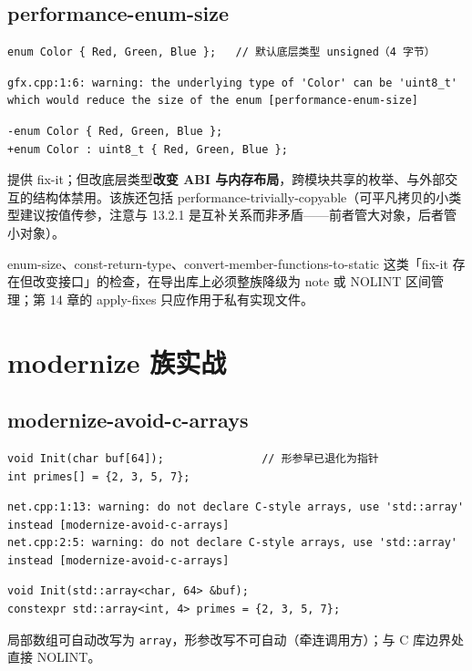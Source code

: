 \documentclass[12pt,a4paper,fontset=fandol]{ctexbook}
\newcommand{\Tp}[1]{\texttt{#1}}
\begin{document}
\subsection{performance-enum-size}\label{sec:ch13-s2d}
\begin{lstlisting}[style=cppstyle]
enum Color { Red, Green, Blue };   // 默认底层类型 unsigned（4 字节）
\end{lstlisting}
\begin{lstlisting}[style=shellstyle]
gfx.cpp:1:6: warning: the underlying type of 'Color' can be 'uint8_t'
which would reduce the size of the enum [performance-enum-size]
\end{lstlisting}
\begin{lstlisting}[style=diffstyle]
-enum Color { Red, Green, Blue };
+enum Color : uint8_t { Red, Green, Blue };
\end{lstlisting}
提供 fix-it；但改底层类型\textbf{改变 ABI 与内存布局}，跨模块共享的枚举、与外部交互的结构体禁用。该族还包括 performance-trivially-copyable（可平凡拷贝的小类型建议按值传参，注意与 13.2.1 是互补关系而非矛盾——前者管大对象，后者管小对象）。
\begin{warning}[title={autofix 与 ABI 的边界}]
enum-size、const-return-type、convert-member-functions-to-static 这类「fix-it 存在但改变接口」的检查，在导出库上必须整族降级为 note 或 NOLINT 区间管理；第 14 章的 apply-fixes 只应作用于私有实现文件。
\end{warning}

\section{modernize 族实战}\label{sec:ch13-s3}
\subsection{modernize-avoid-c-arrays}\label{sec:ch13-s3a}
\begin{lstlisting}[style=cppstyle]
void Init(char buf[64]);               // 形参早已退化为指针
int primes[] = {2, 3, 5, 7};
\end{lstlisting}
\begin{lstlisting}[style=shellstyle]
net.cpp:1:13: warning: do not declare C-style arrays, use 'std::array' instead [modernize-avoid-c-arrays]
net.cpp:2:5: warning: do not declare C-style arrays, use 'std::array' instead [modernize-avoid-c-arrays]
\end{lstlisting}
\begin{lstlisting}[style=cppstyle]
void Init(std::array<char, 64> &buf);
constexpr std::array<int, 4> primes = {2, 3, 5, 7};
\end{lstlisting}
局部数组可自动改写为 \Tp{array}，形参改写不可自动（牵连调用方）；与 C 库边界处直接 NOLINT。
\end{document}
